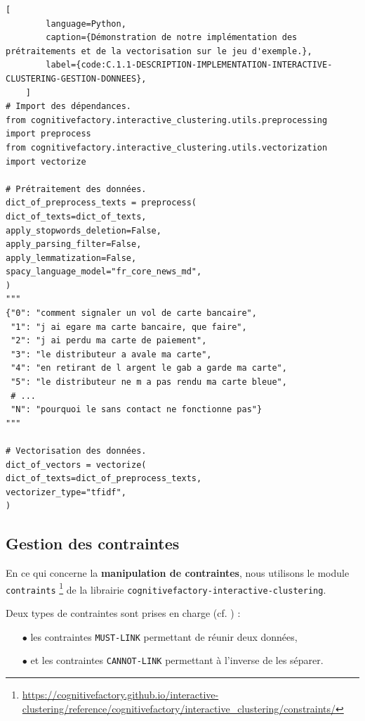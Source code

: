 	\begin{lstlisting}[
		language=Python,
		caption={Démonstration de notre implémentation des prétraitements et de la vectorisation sur le jeu d'exemple.},
		label={code:C.1.1-DESCRIPTION-IMPLEMENTATION-INTERACTIVE-CLUSTERING-GESTION-DONNEES},
	]
# Import des dépendances.
from cognitivefactory.interactive_clustering.utils.preprocessing import preprocess
from cognitivefactory.interactive_clustering.utils.vectorization import vectorize

# Prétraitement des données.
dict_of_preprocess_texts = preprocess(
dict_of_texts=dict_of_texts,
apply_stopwords_deletion=False,
apply_parsing_filter=False,
apply_lemmatization=False,
spacy_language_model="fr_core_news_md",
)
"""
{"0": "comment signaler un vol de carte bancaire",
 "1": "j ai egare ma carte bancaire, que faire",
 "2": "j ai perdu ma carte de paiement",
 "3": "le distributeur a avale ma carte",
 "4": "en retirant de l argent le gab a garde ma carte",
 "5": "le distributeur ne m a pas rendu ma carte bleue",
 # ...
 "N": "pourquoi le sans contact ne fonctionne pas"}
"""

# Vectorisation des données.
dict_of_vectors = vectorize(
dict_of_texts=dict_of_preprocess_texts,
vectorizer_type="tfidf",
)
	\end{lstlisting}
	
	\subsection{Gestion des contraintes}
	\label{annex:C.1.2-DESCRIPTION-IMPLEMENTATION-INTERACTIVE-CLUSTERING-GESTION-DES-CONTRAINTES}
	
	En ce qui concerne la \textbf{manipulation de contraintes}, nous utilisons le module \texttt{contraints} \footnote{
		\url{https://cognitivefactory.github.io/interactive-clustering/reference/cognitivefactory/interactive_clustering/constraints/}
	} de la librairie \texttt{cognitivefactory-interactive-clustering}.
	
	Deux types de contraintes sont prises en charge (cf. \cite{wagstaff-cardie:2000:clustering-instancelevel-constraints}) :
	\begin{itemize}
		\item[\(\bullet\)] les contraintes \texttt{MUST-LINK} permettant de réunir deux données,
		\item[\(\bullet\)] et les contraintes \texttt{CANNOT-LINK} permettant à l'inverse de les séparer.
	\end{itemize}

